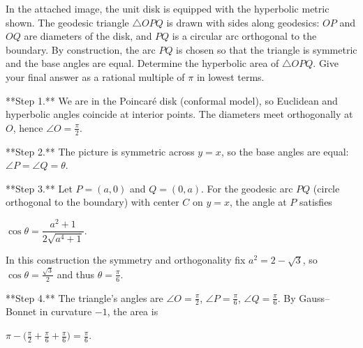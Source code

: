 In the attached image, the unit disk is equipped with the hyperbolic metric shown. The geodesic triangle $\triangle OPQ$ is drawn with sides along geodesics: $OP$ and $OQ$ are diameters of the disk, and $PQ$ is a circular arc orthogonal to the boundary. By construction, the arc $PQ$ is chosen so that the triangle is symmetric and the base angles are equal. Determine the hyperbolic area of $\triangle OPQ$. Give your final answer as a rational multiple of $\pi$ in lowest terms.

**Step 1.** We are in the Poincaré disk (conformal model), so Euclidean and hyperbolic angles coincide at interior points. The diameters meet orthogonally at $O$, hence $\angle O = \tfrac{\pi}{2}$.

 **Step 2.** The picture is symmetric across $y=x$, so the base angles are equal: $\angle P = \angle Q = \theta$.

  **Step 3.** Let $P=(a,0)$ and $Q=(0,a)$. For the geodesic arc $PQ$ (circle orthogonal to the boundary) with center $C$ on $y=x$, the angle at $P$ satisfies

$\cos \theta = \dfrac{a^2+1}{2\sqrt{a^4+1}}$.

In this construction the symmetry and orthogonality fix $a^2 = 2 - \sqrt{3}$, so $\cos \theta = \tfrac{\sqrt{3}}{2}$ and thus $\theta = \tfrac{\pi}{6}$.

  **Step 4.** The triangle’s angles are $\angle O = \tfrac{\pi}{2}$, $\angle P = \tfrac{\pi}{6}$, $\angle Q = \tfrac{\pi}{6}$. By Gauss–Bonnet in curvature $-1$, the area is

$\pi - \big(\tfrac{\pi}{2} + \tfrac{\pi}{6} + \tfrac{\pi}{6}\big) = \tfrac{\pi}{6}$.